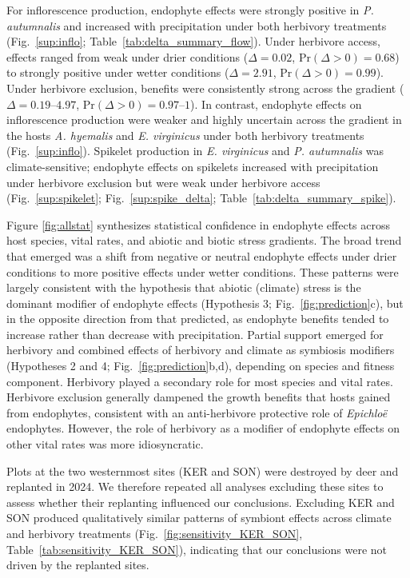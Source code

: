 \documentclass[12pt]{article}\usepackage[]{graphicx}\usepackage[dvipsnames]{xcolor}
\begin{document}
For inflorescence production, endophyte effects were strongly positive in \textit{P. autumnalis} and increased with precipitation under both herbivory treatments (Fig.~\ref{sup:inflo}; Table~\ref{tab:delta_summary_flow}). 
Under herbivore access, effects ranged from weak under drier conditions ($\Delta = 0.02$, $\mathrm{Pr}(\Delta > 0) = 0.68$) to strongly positive under wetter conditions ($\Delta = 2.91$, $\mathrm{Pr}(\Delta > 0) = 0.99$). 
Under herbivore exclusion, benefits were consistently strong across the gradient ($\Delta = 0.19$--$4.97$, $\mathrm{Pr}(\Delta > 0) = 0.97$--$1$). 
In contrast, endophyte effects on inflorescence production were weaker and highly uncertain across the gradient in the hosts \textit{A. hyemalis} and \textit{E. virginicus} under both herbivory treatments (Fig.~\ref{sup:inflo}). 
Spikelet production in \textit{E. virginicus} and \textit{P. autumnalis} was climate-sensitive; endophyte effects on spikelets increased with precipitation under herbivore exclusion but were weak under herbivore access (Fig.~\ref{sup:spikelet}; Fig.~\ref{sup:spike_delta}; Table~\ref{tab:delta_summary_spike}).

Figure \ref{fig:allstat} synthesizes statistical confidence in endophyte effects across host species, vital rates, and abiotic and biotic stress gradients. 
The broad trend that emerged was a shift from negative or neutral endophyte effects under drier conditions to more positive effects under wetter conditions.
These patterns were largely consistent with the hypothesis that abiotic (climate) stress is the dominant modifier of endophyte effects (Hypothesis 3; Fig.~\ref{fig:prediction}c), but in the opposite direction from that predicted, as endophyte benefits tended to increase rather than decrease with precipitation. 
Partial support emerged for herbivory and combined effects of herbivory and climate as symbiosis modifiers (Hypotheses 2 and 4; Fig.~\ref{fig:prediction}b,d), depending on species and fitness component. 
Herbivory played a secondary role for most species and vital rates. 
Herbivore exclusion generally dampened the growth benefits that hosts gained from endophytes, consistent with an anti-herbivore protective role of \textit{Epichloë} endophytes. 
However, the role of herbivory as a modifier of endophyte effects on  other vital rates was more idiosyncratic. 

Plots at the two westernmost sites (KER and SON) were destroyed by deer and replanted in 2024.
We therefore repeated all analyses excluding these sites to assess whether their replanting influenced our conclusions.
Excluding KER and SON produced qualitatively similar patterns of symbiont effects across climate and herbivory treatments (Fig.~\ref{fig:sensitivity_KER_SON}, Table~\ref{tab:sensitivity_KER_SON}), indicating that our conclusions were not driven by the replanted sites.
\end{document}
